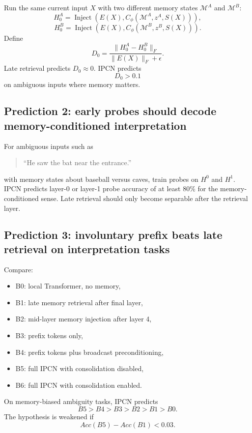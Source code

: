 \documentclass[11pt]{article}
\newcommand{\Mem}{\mathcal{M}}
\begin{document}
Run the same current input \(X\) with two different memory states \(\Mem^A\) and \(\Mem^B\):
\begin{equation}
    H_0^A=\operatorname{Inject}(E(X),C_\phi(\Mem^A,z^A,S(X))),
\end{equation}
\begin{equation}
    H_0^B=\operatorname{Inject}(E(X),C_\phi(\Mem^B,z^B,S(X))).
\end{equation}
Define
\begin{equation}
    D_0=\frac{\|H_0^A-H_0^B\|_F}{\|E(X)\|_F+\epsilon}.
\end{equation}
Late retrieval predicts \(D_0\approx0\). IPCN predicts
\begin{equation}
    D_0>0.1
\end{equation}
on ambiguous inputs where memory matters.

\subsection{Prediction 2: early probes should decode memory-conditioned interpretation}

For ambiguous inputs such as
\begin{quote}
``He saw the bat near the entrance.''
\end{quote}
with memory states about baseball versus caves, train probes on \(H^0\) and \(H^1\). IPCN predicts layer-0 or layer-1 probe accuracy of at least 80\% for the memory-conditioned sense. Late retrieval should only become separable after the retrieval layer.

\subsection{Prediction 3: involuntary prefix beats late retrieval on interpretation tasks}

Compare:
\begin{itemize}
    \item B0: local Transformer, no memory,
    \item B1: late memory retrieval after final layer,
    \item B2: mid-layer memory injection after layer 4,
    \item B3: prefix tokens only,
    \item B4: prefix tokens plus broadcast preconditioning,
    \item B5: full IPCN with consolidation disabled,
    \item B6: full IPCN with consolidation enabled.
\end{itemize}
On memory-biased ambiguity tasks, IPCN predicts
\begin{equation}
    B5 > B4 > B3 > B2 > B1 > B0.
\end{equation}
The hypothesis is weakened if
\begin{equation}
    Acc(B5)-Acc(B1)<0.03.
\end{equation}
\end{document}
